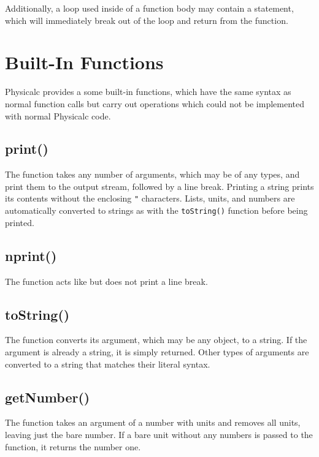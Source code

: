 Additionally, a loop used inside of a function body may contain a
 statement, which will immediately break out of the loop
and return from the function.



\section{Built-In Functions}
\label{builtins}

Physicalc provides a some built-in functions, which have the same
syntax as normal function calls but carry out operations which could
not be implemented with normal Physicalc code.

\subsection{print()}

The  function takes any number of arguments, which may be
of any types, and print them to the output stream, followed by a line
break.  Printing a string prints its contents without the enclosing
\verb|"| characters.  Lists, units, and numbers are automatically
converted to strings as with the \verb|toString()| function before being
printed.

\subsection{nprint()}

The  function acts like  but does not print
a line break.

\subsection{toString()}

The  function converts its argument, which may be any
object, to a string.  If the argument is already a string, it is
simply returned.  Other types of arguments are converted to a string
that matches their literal syntax.

\subsection{getNumber()}

The  function takes an argument of a number with
units and removes all units, leaving just the bare number.  If a bare
unit without any numbers is passed to the function, it returns the
number one.

